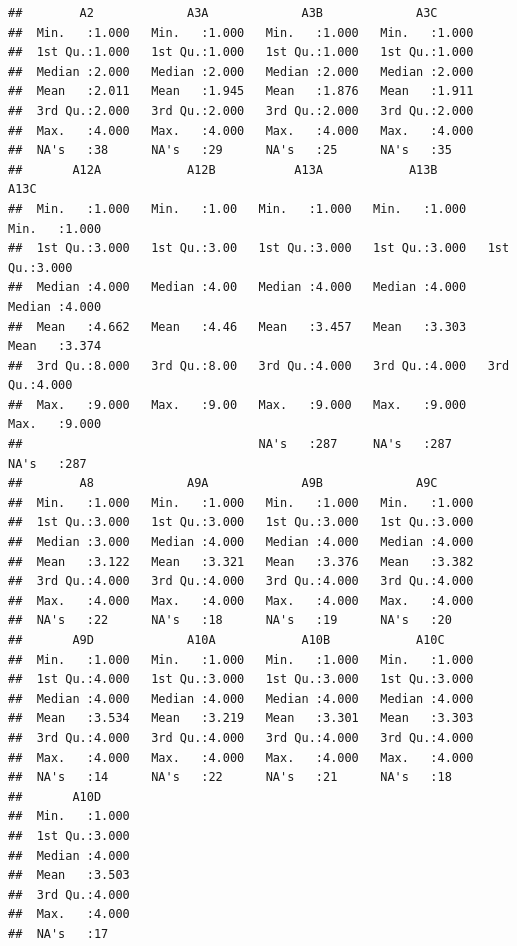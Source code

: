 \documentclass[
]{article}
\begin{document}
\begin{verbatim}
##        A2             A3A             A3B             A3C       
##  Min.   :1.000   Min.   :1.000   Min.   :1.000   Min.   :1.000  
##  1st Qu.:1.000   1st Qu.:1.000   1st Qu.:1.000   1st Qu.:1.000  
##  Median :2.000   Median :2.000   Median :2.000   Median :2.000  
##  Mean   :2.011   Mean   :1.945   Mean   :1.876   Mean   :1.911  
##  3rd Qu.:2.000   3rd Qu.:2.000   3rd Qu.:2.000   3rd Qu.:2.000  
##  Max.   :4.000   Max.   :4.000   Max.   :4.000   Max.   :4.000  
##  NA's   :38      NA's   :29      NA's   :25      NA's   :35     
##       A12A            A12B           A13A            A13B            A13C      
##  Min.   :1.000   Min.   :1.00   Min.   :1.000   Min.   :1.000   Min.   :1.000  
##  1st Qu.:3.000   1st Qu.:3.00   1st Qu.:3.000   1st Qu.:3.000   1st Qu.:3.000  
##  Median :4.000   Median :4.00   Median :4.000   Median :4.000   Median :4.000  
##  Mean   :4.662   Mean   :4.46   Mean   :3.457   Mean   :3.303   Mean   :3.374  
##  3rd Qu.:8.000   3rd Qu.:8.00   3rd Qu.:4.000   3rd Qu.:4.000   3rd Qu.:4.000  
##  Max.   :9.000   Max.   :9.00   Max.   :9.000   Max.   :9.000   Max.   :9.000  
##                                 NA's   :287     NA's   :287     NA's   :287    
##        A8             A9A             A9B             A9C       
##  Min.   :1.000   Min.   :1.000   Min.   :1.000   Min.   :1.000  
##  1st Qu.:3.000   1st Qu.:3.000   1st Qu.:3.000   1st Qu.:3.000  
##  Median :3.000   Median :4.000   Median :4.000   Median :4.000  
##  Mean   :3.122   Mean   :3.321   Mean   :3.376   Mean   :3.382  
##  3rd Qu.:4.000   3rd Qu.:4.000   3rd Qu.:4.000   3rd Qu.:4.000  
##  Max.   :4.000   Max.   :4.000   Max.   :4.000   Max.   :4.000  
##  NA's   :22      NA's   :18      NA's   :19      NA's   :20     
##       A9D             A10A            A10B            A10C      
##  Min.   :1.000   Min.   :1.000   Min.   :1.000   Min.   :1.000  
##  1st Qu.:4.000   1st Qu.:3.000   1st Qu.:3.000   1st Qu.:3.000  
##  Median :4.000   Median :4.000   Median :4.000   Median :4.000  
##  Mean   :3.534   Mean   :3.219   Mean   :3.301   Mean   :3.303  
##  3rd Qu.:4.000   3rd Qu.:4.000   3rd Qu.:4.000   3rd Qu.:4.000  
##  Max.   :4.000   Max.   :4.000   Max.   :4.000   Max.   :4.000  
##  NA's   :14      NA's   :22      NA's   :21      NA's   :18     
##       A10D      
##  Min.   :1.000  
##  1st Qu.:3.000  
##  Median :4.000  
##  Mean   :3.503  
##  3rd Qu.:4.000  
##  Max.   :4.000  
##  NA's   :17
\end{verbatim}
\end{document}
